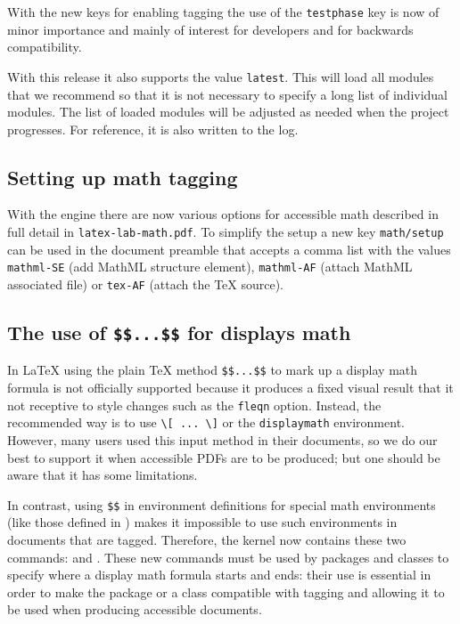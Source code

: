 \documentclass{ltnews}
\providecommand\env[1]{\texttt{#1}}
\providecommand\LuaTeX{\hologo{LuaTeX}}
\providecommand\env[1]{\texttt{#1}}
\begin{document}
With the new keys for enabling tagging the use of the
\texttt{testphase} key is now of minor importance and mainly of
interest for developers and for backwards compatibility.

With this release it also supports the value \texttt{latest}.
This will load all modules that we recommend so that it is not
necessary to specify a long list of individual modules. The list of loaded modules
will be adjusted as needed when the project progresses. For reference,
it is also written to the log.



\subsection{Setting up math tagging}

With the \LuaTeX{} engine there are now various options for accessible
math described in full detail in \texttt{latex-lab-math.pdf}. To
simplify the setup a new key \texttt{math/setup} can be used in the
document preamble that accepts a comma list with the values
\texttt{mathml-SE} (add MathML structure element), \texttt{mathml-AF}
(attach MathML associated file) or \texttt{tex-AF} (attach the \TeX{}
source).


\subsection{The use of \texttt{\$\$...\$\$} for displays math}

In \LaTeX{} using the plain \TeX{} method \verb=$$...$$= to mark up a
display math formula is not officially supported because it produces a fixed
visual result that it not receptive to style changes such as the
\texttt{fleqn} option. Instead, the recommended way is to use
\verb=\[ ... \]= or the \env{displaymath} environment. However, many
users used this input method in their documents, so we do our best to
support it when accessible PDFs are to be produced; but one should be
aware that it has some limitations.

In contrast, using \verb=$$= in environment definitions for special
math environments (like those defined in ) makes it
impossible to use such environments in documents that are
tagged.
Therefore, the kernel now contains these two commands:
 and .
These new commands must be used by packages and classes to specify
where a display math formula starts and ends: their use is essential in
order to make the package or a class compatible with tagging and allowing it to
be used when producing accessible documents.
\end{document}
